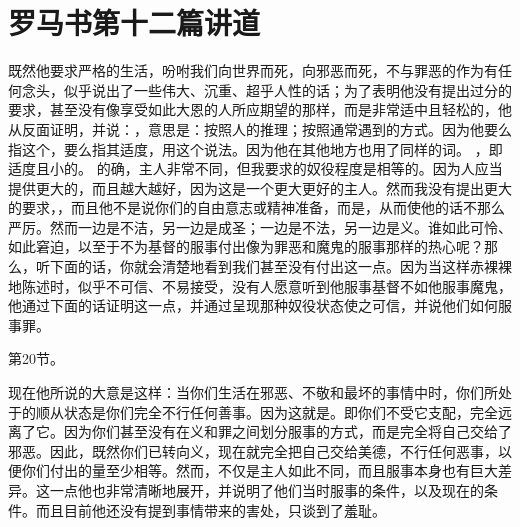 

\section{罗马书第十二篇讲道}

\par

\par

既然他要求严格的生活，吩咐我们向世界而死，向邪恶而死，不与罪恶的作为有任何念头，似乎说出了一些伟大、沉重、超乎人性的话；为了表明他没有提出过分的要求，甚至没有像享受如此大恩的人所应期望的那样，而是非常适中且轻松的，他从反面证明，并说：，意思是：按照人的推理；按照通常遇到的方式。因为他要么指这个，要么指其适度，用这个说法。因为他在其他地方也用了同样的词。 ，即适度且小的。 的确，主人非常不同，但我要求的奴役程度是相等的。因为人应当提供更大的，而且越大越好，因为这是一个更大更好的主人。然而我没有提出更大的要求，，而且他不是说你们的自由意志或精神准备，而是，从而使他的话不那么严厉。然而一边是不洁，另一边是成圣；一边是不法，另一边是义。谁如此可怜、如此窘迫，以至于不为基督的服事付出像为罪恶和魔鬼的服事那样的热心呢？那么，听下面的话，你就会清楚地看到我们甚至没有付出这一点。因为当这样赤裸裸地陈述时，似乎不可信、不易接受，没有人愿意听到他服事基督不如他服事魔鬼，他通过下面的话证明这一点，并通过呈现那种奴役状态使之可信，并说他们如何服事罪。\par

第20节。\par

现在他所说的大意是这样：当你们生活在邪恶、不敬和最坏的事情中时，你们所处于的顺从状态是你们完全不行任何善事。因为这就是。即你们不受它支配，完全远离了它。因为你们甚至没有在义和罪之间划分服事的方式，而是完全将自己交给了邪恶。因此，既然你们已转向义，现在就完全把自己交给美德，不行任何恶事，以便你们付出的量至少相等。然而，不仅是主人如此不同，而且服事本身也有巨大差异。这一点他也非常清晰地展开，并说明了他们当时服事的条件，以及现在的条件。而且目前他还没有提到事情带来的害处，只谈到了羞耻。\par

